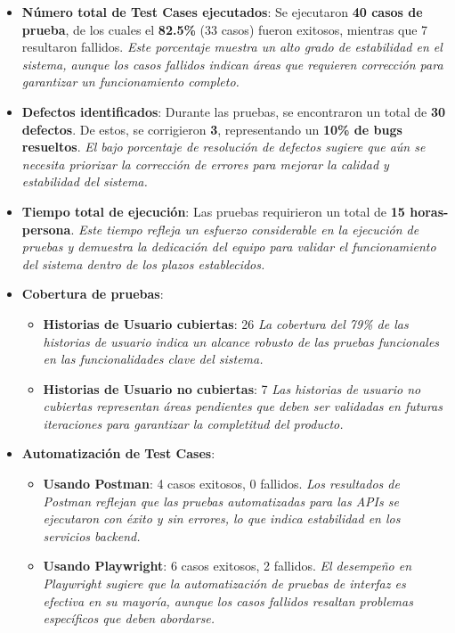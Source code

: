 \documentclass[stu, 12pt, letterpaper, donotrepeattitle, floatsintext, natbib]{apa7}
\begin{document}
\begin{itemize}
    \item \textbf{Número total de Test Cases ejecutados}:  
    Se ejecutaron \textbf{40 casos de prueba}, de los cuales el \textbf{82.5\%} (33 casos) fueron exitosos, mientras que 7 resultaron fallidos.  
    \textit{Este porcentaje muestra un alto grado de estabilidad en el sistema, aunque los casos fallidos indican áreas que requieren corrección para garantizar un funcionamiento completo.}

    \item \textbf{Defectos identificados}:  
    Durante las pruebas, se encontraron un total de \textbf{30 defectos}. De estos, se corrigieron \textbf{3}, representando un \textbf{10\% de bugs resueltos}.  
    \textit{El bajo porcentaje de resolución de defectos sugiere que aún se necesita priorizar la corrección de errores para mejorar la calidad y estabilidad del sistema.}

    \item \textbf{Tiempo total de ejecución}:  
    Las pruebas requirieron un total de \textbf{15 horas-persona}.  
    \textit{Este tiempo refleja un esfuerzo considerable en la ejecución de pruebas y demuestra la dedicación del equipo para validar el funcionamiento del sistema dentro de los plazos establecidos.}

    \item \textbf{Cobertura de pruebas}:  
    \begin{itemize}
        \item \textbf{Historias de Usuario cubiertas}: 26  
        \textit{La cobertura del 79\% de las historias de usuario indica un alcance robusto de las pruebas funcionales en las funcionalidades clave del sistema.}
        \item \textbf{Historias de Usuario no cubiertas}: 7  
        \textit{Las historias de usuario no cubiertas representan áreas pendientes que deben ser validadas en futuras iteraciones para garantizar la completitud del producto.}
    \end{itemize}

    \item \textbf{Automatización de Test Cases}:  
    \begin{itemize}
        \item \textbf{Usando Postman}: 4 casos exitosos, 0 fallidos.  
        \textit{Los resultados de Postman reflejan que las pruebas automatizadas para las APIs se ejecutaron con éxito y sin errores, lo que indica estabilidad en los servicios backend.}
        \item \textbf{Usando Playwright}: 6 casos exitosos, 2 fallidos.  
        \textit{El desempeño en Playwright sugiere que la automatización de pruebas de interfaz es efectiva en su mayoría, aunque los casos fallidos resaltan problemas específicos que deben abordarse.}
    \end{itemize}
\end{itemize}
\end{document}
